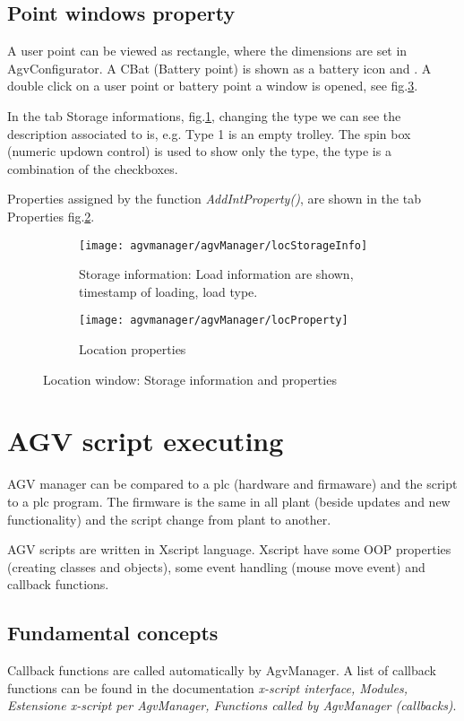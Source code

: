 \subsection{Point windows property}
A user point can be viewed as rectangle, where the dimensions are set in AgvConfigurator. A CBat (Battery point) is shown as a battery icon and . A double click on a user point or battery point a window is opened, see fig.\ref{fig:refLocation}.

In the tab Storage informations, fig.\ref{fig:refLocStorageInfo}, changing the type we can see the description associated to is, e.g. Type 1 is an empty trolley. The spin box (numeric updown control) is used to show only the type, the type is a combination of the checkboxes.

Properties assigned by the function \textit{AddIntProperty()}, are shown in the tab Properties fig.\ref{fig:refLocationProperties}.

\begin{figure}[h]
	\centering
	\begin{subfigure}[b]{0.5\textwidth}
		\texttt{[image: agvmanager/agvManager/locStorageInfo]}
		\caption{Storage information: Load information are shown, timestamp of loading, load type.}
		\label{fig:refLocStorageInfo}
	\end{subfigure}
	\quad
	\begin{subfigure}[b]{0.5\textwidth}
		\texttt{[image: agvmanager/agvManager/locProperty]}
		\caption{Location properties}
		\label{fig:refLocationProperties}
	\end{subfigure}
	\caption{Location window: Storage information and properties}\label{fig:refLocation}
\end{figure}

\section{AGV script executing}
AGV manager can be compared to a plc (hardware and firmaware) and the script to a plc program. The firmware is the same in all plant (beside updates and new functionality) and the script change from plant to another.

AGV scripts are written in Xscript language. Xscript have some OOP properties (creating classes and objects), some event handling (mouse move event) and callback functions.

\subsection{Fundamental concepts}
Callback functions are called automatically by AgvManager. A list of callback functions can be found in the documentation \textit{x-script interface, Modules, Estensione x-script per AgvManager, Functions called by AgvManager (callbacks)}.


